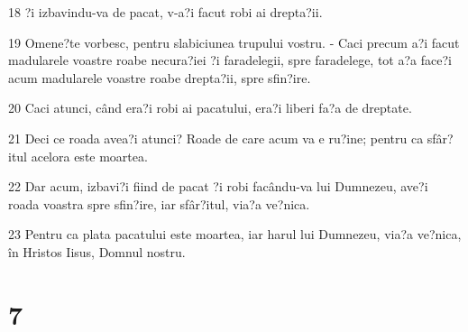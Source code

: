 \par 18 ?i izbavindu-va de pacat, v-a?i facut robi ai drepta?ii.
\par 19 Omene?te vorbesc, pentru slabiciunea trupului vostru. - Caci precum a?i facut madularele voastre roabe necura?iei ?i faradelegii, spre faradelege, tot a?a face?i acum madularele voastre roabe drepta?ii, spre sfin?ire.
\par 20 Caci atunci, când era?i robi ai pacatului, era?i liberi fa?a de dreptate.
\par 21 Deci ce roada avea?i atunci? Roade de care acum va e ru?ine; pentru ca sfâr?itul acelora este moartea.
\par 22 Dar acum, izbavi?i fiind de pacat ?i robi facându-va lui Dumnezeu, ave?i roada voastra spre sfin?ire, iar sfâr?itul, via?a ve?nica.
\par 23 Pentru ca plata pacatului este moartea, iar harul lui Dumnezeu, via?a ve?nica, în Hristos Iisus, Domnul nostru.

\chapter{7}

